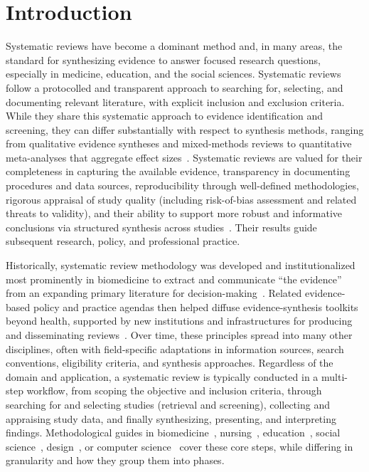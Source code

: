 \section{Introduction}

Systematic reviews have become a dominant method and, in many areas, the standard for synthesizing evidence to answer focused research questions, especially in medicine, education, and the social sciences. Systematic reviews follow a protocolled and transparent approach to searching for, selecting, and documenting relevant literature, with explicit inclusion and exclusion criteria. While they share this systematic approach to evidence identification and screening, they can differ substantially with respect to synthesis methods, ranging from qualitative evidence syntheses and mixed-methods reviews to quantitative meta-analyses that aggregate effect sizes~\cite{gough:2012}. Systematic reviews are valued for their completeness in capturing the available evidence, transparency in documenting procedures and data sources, reproducibility through well-defined methodologies, rigorous appraisal of study quality (including risk-of-bias assessment and related threats to validity), and their ability to support more robust and informative conclusions via structured synthesis across studies~\cite{liberati:2009, mulrow:1994}. Their results guide subsequent research, policy, and professional practice.

Historically, systematic review methodology was developed and institutionalized most prominently in biomedicine to extract and communicate ``the evidence'' from an expanding primary literature for decision-making~\cite{chalmers:1993, guyatt:1992}. Related evidence-based policy and practice agendas then helped diffuse evidence-synthesis toolkits beyond health, supported by new institutions and infrastructures for producing and disseminating reviews~\cite{simons:2021}. Over time, these principles spread into many other disciplines, often with field-specific adaptations in information sources, search conventions, eligibility criteria, and synthesis approaches. Regardless of the domain and application, a systematic review is typically conducted in a multi-step workflow, from scoping the objective and inclusion criteria, through searching for and selecting studies (retrieval and screening), collecting and appraising study data, and finally synthesizing, presenting, and interpreting findings. Methodological guides in biomedicine~\cite{chandler_cochrane_2019}, nursing~\cite{bettany_saltikov_how_2012}, education~\cite{newman_systematic_2020}, social science~\cite{petticrew_systematic_2008}, design~\cite{lame:2019}, or computer science~\cite{kitchenham:2004} cover these core steps, while differing in granularity and how they group them into phases.

